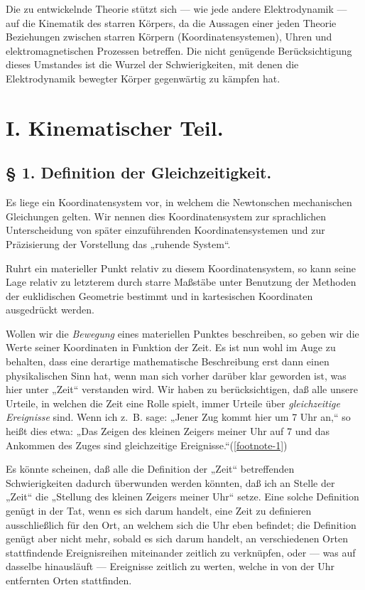 \documentclass[17pt]{webarticle}       %
\begin{document}
Die zu entwickelnde Theorie stützt sich — wie jede andere Elektrodynamik — auf die Kinematik des starren Körpers, da die Aussagen einer jeden Theorie Beziehungen zwischen starren Körpern (Koordinatensystemen), Uhren und elektromagnetischen Prozessen betreffen. Die nicht genügende Berücksichtigung dieses Umstandes ist die Wurzel der Schwierigkeiten, mit denen die Elektrodynamik bewegter Körper gegenwärtig zu kämpfen hat.

\section*{I. Kinematischer Teil.}

\subsection*{§ 1. Definition der Gleichzeitigkeit.}

Es liege ein Koordinatensystem vor, in welchem die Newtonschen mechanischen Gleichungen gelten. Wir nennen dies Koordinatensystem zur sprachlichen Unterscheidung von später einzuführenden Koordinatensystemen und zur Präzisierung der Vorstellung das „ruhende System“.

Ruhrt ein materieller Punkt relativ zu diesem Koordinatensystem, so kann seine Lage relativ zu letzterem durch starre Maßstäbe unter Benutzung der Methoden der euklidischen Geometrie bestimmt und in kartesischen Koordinaten ausgedrückt werden.

Wollen wir die \emph{Bewegung} eines materiellen Punktes beschreiben, so geben wir die Werte seiner Koordinaten in Funktion der Zeit. Es ist nun wohl im Auge zu behalten, dass eine derartige mathematische Beschreibung erst dann einen physikalischen Sinn hat, wenn man sich vorher darüber klar geworden ist, was hier unter „Zeit“ verstanden wird. Wir haben zu berücksichtigen, daß alle unsere Urteile, in welchen die Zeit eine Rolle spielt, immer Urteile über \emph{gleichzeitige Ereignisse} sind. Wenn ich z.~B. sage: „Jener Zug kommt hier um 7 Uhr an,“ so heißt dies etwa: „Das Zeigen des kleinen Zeigers meiner Uhr auf 7 und das Ankommen des Zuges sind gleichzeitige Ereignisse.“(\ref{footnote-1})

Es könnte scheinen, daß alle die Definition der „Zeit“ betreffenden Schwierigkeiten dadurch überwunden werden könnten, daß ich an Stelle der „Zeit“ die „Stellung des kleinen Zeigers meiner Uhr“ setze. Eine solche Definition genügt in der Tat, wenn es sich darum handelt, eine Zeit zu definieren ausschließlich für den Ort, an welchem sich die Uhr eben befindet; die Definition genügt aber nicht mehr, sobald es sich darum handelt, an verschiedenen Orten stattfindende Ereignisreihen miteinander zeitlich zu verknüpfen, oder — was auf dasselbe hinausläuft — Ereignisse zeitlich zu werten, welche in von der Uhr entfernten Orten stattfinden.
\end{document}
